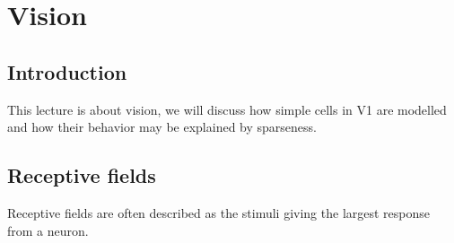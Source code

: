 \documentclass[11pt,a4paper]{scrartcl}
\begin{document}
\section*{Vision}

\subsection*{Introduction} 
This lecture is about vision, we will discuss how simple cells in V1
are modelled and how their behavior may be explained by sparseness.

\subsection*{Receptive fields}
Receptive fields are often described as the stimuli
giving the largest response from a neuron.
\end{document}
